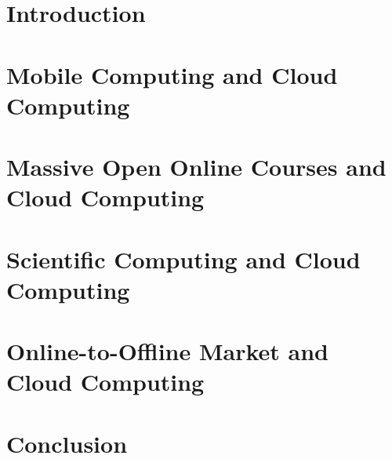 \section{Introduction}

\section{Mobile Computing and Cloud Computing}

\section{Massive Open Online Courses and Cloud Computing}

\section{Scientific Computing and Cloud Computing}

\section{Online-to-Offline Market and Cloud Computing}

\section{Conclusion}
